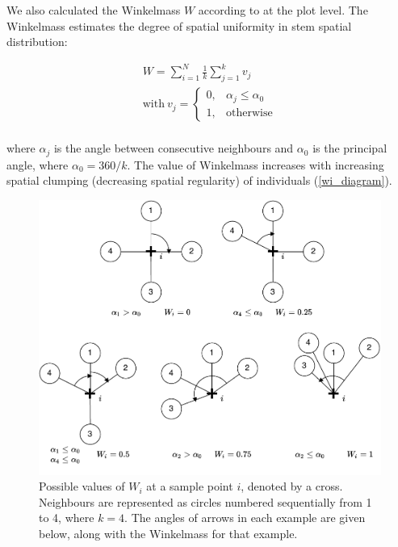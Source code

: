\documentclass[11pt,a4paper]{article}
\begin{document}
We also calculated the Winkelmass $W$ according to \citet{Gadow2002} at the plot level. The Winkelmass estimates the degree of spatial uniformity in stem spatial distribution:

\begin{gather}
	W = \sum_{i=1}^{N} \frac{1}{k} \sum_{j=1}^{k} v_{j} \\
	\text{with}\ v_{j} = \begin{cases}
		0,& \alpha_{j} \le \alpha_{0} \\
		1,& \text{otherwise}
	\end{cases} \\
\end{gather}

where $\alpha_{j}$ is the angle between consecutive neighbours and $\alpha_{0}$ is the principal angle, where $\alpha_{0} = 360 / k$. The value of Winkelmass increases with increasing spatial clumping (decreasing spatial regularity) of individuals (\autoref{wi_diagram}).

\begin{figure}[H]
\centering
	\includegraphics[width=\textwidth]{winkelmass}
	\caption{Possible values of $W_{i}$ at a sample point $i$, denoted by a cross. Neighbours are represented as circles numbered sequentially from 1 to 4, where $k = 4$. The angles of arrows in each example are given below, along with the Winkelmass for that example.}
	\label{winkelmass}
\end{figure}
\end{document}
